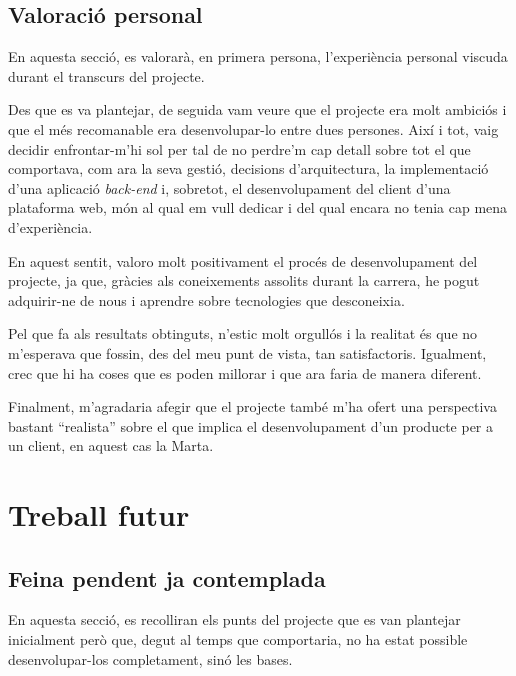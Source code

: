 \documentclass[a4paper,12pt]{ThesisStyle}
\begin{document}
\section{Valoració personal}
\label{sec:valoracio}

En aquesta secció, es valorarà, en primera persona, l'experiència personal viscuda durant el transcurs del projecte.

Des que es va plantejar, de seguida vam veure que el projecte era molt ambiciós i que el més recomanable era desenvolupar-lo entre dues persones. Així i tot, vaig decidir enfrontar-m'hi sol per tal de no perdre'm cap detall sobre tot el que comportava, com ara la seva gestió, decisions d'arquitectura, la implementació d'una aplicació \textit{back-end} i, sobretot, el desenvolupament del client d'una plataforma web, món al qual em vull dedicar i del qual encara no tenia cap mena d'experiència.

En aquest sentit, valoro molt positivament el procés de desenvolupament del projecte, ja que, gràcies als coneixements assolits durant la carrera, he pogut adquirir-ne de nous i aprendre sobre tecnologies que desconeixia.

Pel que fa als resultats obtinguts, n'estic molt orgullós i la realitat és que no m'esperava que fossin, des del meu punt de vista, tan satisfactoris. Igualment, crec que hi ha coses que es poden millorar i que ara faria de manera diferent.

Finalment, m'agradaria afegir que el projecte també m'ha ofert una perspectiva bastant ``realista'' sobre el que implica el desenvolupament d'un producte per a un client, en aquest cas la Marta.


\chapter{Treball futur}
\label{cap:treball_futur}

\section{Feina pendent ja contemplada}
\label{sec:feina_pendent}

En aquesta secció, es recolliran els punts del projecte que es van plantejar inicialment però que, degut al temps que comportaria, no ha estat possible desenvolupar-los completament, sinó les bases.
\end{document}
